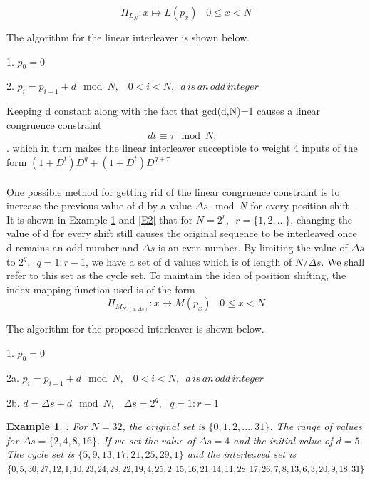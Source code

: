 \documentclass[twocolumn]{article}
\newtheorem{example}[theorem]{Example}
\begin{document}
 $$\Pi_{\mathit{L}_{N}} : x \mapsto L(p_x)\,\,\,\,\, 0\leq x<N$$
 
 The algorithm for the linear interleaver is shown below.
  
   1. $p_0=0$
 
  2. $p_i=p_{i-1}+d \mod N,\,\,\,\,\, 0<i<N,\,\,\, \mathit{d \,is \,an \,odd \,integer}$
 
 
 Keeping d constant along with the fact that gcd(d,N)=1 causes a linear congruence
  constraint 
 $$ dt \equiv \tau \mod N, \,\,\,\, $$. which in turn makes the
  linear interleaver succeptible to weight 4 inputs of the form 
  $(1+D^t)D^q+(1+D^t)D^{q+\tau}$
  \paragraph{}
  One possible method for getting rid of the linear congruence constraint is to increase
  the previous value of d by a value $\Delta s \mod N$  for every position shift . 
  It is shown in Example \ref{E1} and \ref{E2}
   that for $N=2^r,\,\,\, r=\{1,2,...\}$, changing the value of d for every shift still 
   causes
   the original sequence to be interleaved once d remains an odd number and $\Delta s$
   is an even number. By limiting the value of $\Delta s$ to $2^q,\,\,\, q=1:r-1$, we 
   have a set of d values which is of length of $N/\Delta s$. We shall refer to this 
   set as the cycle set. To maintain the idea of position shifting, the index mapping
   function used is of the form 
   $$\Pi_{\mathit{M}_{N:(d,\Delta s)}} : x \mapsto M(p_x)\,\,\,\,\, 0\leq x<N$$
  
  The algorithm for the proposed interleaver is shown below.
  
   1. $p_0=0$
 
 2a. $p_i=p_{i-1}+d \mod N,\,\,\,\,\, 0<i<N,\,\,\, \mathit{d \,is \,an \,odd \,integer}$
 
 2b. $d=\Delta s +d \mod N, \,\,\,\,\, \Delta s =2^q, \,\,\,\, q=1:r-1$
 
 
 \begin{example}
 \label{E1}
 : For $N=32$, the original set is $\{0,1,2,...,31\}$. The range of values for 
 $\Delta s = \{ 2,4,8,16\}$.  If we set the value
 of $\Delta s = 4$ and the initial value of $d=5$. 
 The cycle set is $\{ 5,9,13,17,21,25,29,1\}$ and the interleaved set is 
$\{0,5,30,27,12,1,10,23,24,29,22,19, 4, 25 ,2,15 ,16,21,\\14,11, 28,17,
  26, 7, 8, 13, 6, 3, 20, 9, 18, 31\}$
 \end{example}
 
\end{document}
